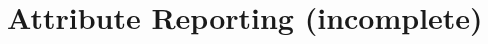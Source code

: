 \hypertarget{group__zcl__reporting}{}\section{Attribute Reporting (incomplete)}
\label{group__zcl__reporting}

